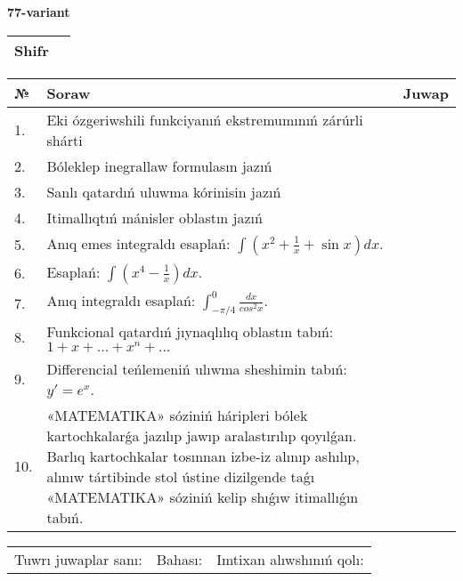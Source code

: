 \documentclass{article}
\begin{document}
  \egroup
  
  \newpage
  
  
  \textbf{77-variant}\\
  
  \bgroup
  \def\arraystretch{1.6} %
  
  \begin{tabular}{|m{5.7cm}|m{9.5cm}|}
  \hline
  Shifr & \\
  \hline
  \end{tabular}
  
  \vspace{1cm}
  
  \begin{tabular}{|m{0.7cm}|m{10cm}|m{4cm}|}
  \hline
  № & Soraw & Juwap \\
  \hline
  1. & Eki ózgeriwshili funkciyanıń ekstremumınıń zárúrli shárti &  \\
  \hline
  2. & Bóleklep inegrallaw formulasın jazıń &  \\
  \hline
  3. & Sanlı qatardıń uluwma kórinisin jazıń &  \\
  \hline
  4. & Itimallıqtıń mánisler oblastın jazıń &  \\
  \hline
  5. & Anıq emes integraldı esaplań: \(\int{\left( x^2  + \frac{1}{x} + \sin x \right)dx}\). &  \\
  \hline
  6. & Esaplań: \(\int\left( x^{4} - \frac{1}{x} \right)dx\). &  \\
  \hline
  7. & Anıq integraldı esaplań: \(\int_{- \pi/4}^{0}\frac{dx}{cos^2 x}\). &  \\
  \hline
  8. & Funkcional qatardıń jıynaqlılıq oblastın tabıń:\(1 + x + ... + x^{n} + ...\) &  \\
  \hline
  9. & Differencial teńlemeniń ulıwma sheshimin tabıń: \(y' = e^{x}\). &  \\
  \hline
  10. & «MATEMATIKA» sóziniń háripleri bólek kartochkalarǵa jazılıp jawıp aralastırılıp qoyılǵan. Barlıq kartochkalar tosınnan izbe-iz alınıp ashılıp, alınıw tártibinde stol ústine dizilgende taǵı «MATEMATIKA» sóziniń kelip shıǵıw itimallıǵın tabıń. &  \\
  \hline
  \end{tabular}
  
  \vspace{1cm}
  
  \begin{tabular}{lll}
  Tuwrı juwaplar sanı: \underline{\hspace{1.5cm}} & 
  Bahası: \underline{\hspace{1.5cm}} & 
  Imtixan alıwshınıń qolı: \underline{\hspace{2cm}} \\
  \end{tabular}
  
\end{document}
